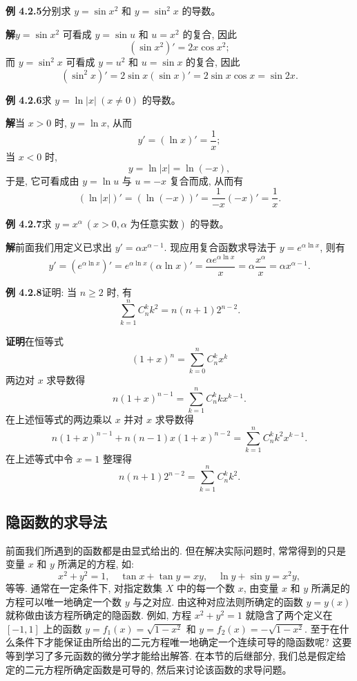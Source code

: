 \documentclass[UTF8,12pt,a4paper,fontset=fandol]{ctexart}
\begin{document}
\noindent\textbf{例 4.2.5}\quad 分别求 $y=\sin x^2$ 和 $y=\sin^2x$ 的导数。

\noindent\textbf{解}\quad $y=\sin x^2$ 可看成 $y=\sin u$ 和 $u=x^2$ 的复合, 因此
\[
  (\sin x^2)'=2x\cos x^2;
\]
而 $y=\sin^2x$ 可看成 $y=u^2$ 和 $u=\sin x$ 的复合, 因此
\[
  (\sin^2x)'=2\sin x(\sin x)'=2\sin x\cos x=\sin2x.
\]

\noindent\textbf{例 4.2.6}\quad 求 $y=\ln|x|\ (x\ne0)$ 的导数。

\noindent\textbf{解}\quad 当 $x>0$ 时, $y=\ln x$, 从而
\[
  y'=(\ln x)'=\frac1x;
\]
当 $x<0$ 时,
\[
  y=\ln|x|=\ln(-x),
\]
于是, 它可看成由 $y=\ln u$ 与 $u=-x$ 复合而成, 从而有
\[
  (\ln|x|)'=(\ln(-x))'=\frac1{-x}(-x)'=\frac1x.
\]

\noindent\textbf{例 4.2.7}\quad 求 $y=x^\alpha\ (x>0,\alpha\text{ 为任意实数})$ 的导数。

\noindent\textbf{解}\quad 前面我们用定义已求出 $y'=\alpha x^{\alpha-1}$. 现应用复合函数求导法于 $y=e^{\alpha\ln x}$, 则有
\[
  y'=(e^{\alpha\ln x})'
  =
  e^{\alpha\ln x}(\alpha\ln x)'
  =
  \frac{\alpha e^{\alpha\ln x}}x
  =
  \alpha\frac{x^\alpha}x
  =
  \alpha x^{\alpha-1}.
\]

\noindent\textbf{例 4.2.8}\quad 证明: 当 $n\geqslant2$ 时, 有
\[
  \sum_{k=1}^{n}C_n^kk^2=n(n+1)2^{n-2}.
\]

\noindent\textbf{证明}\quad 在恒等式
\[
  (1+x)^n=\sum_{k=0}^{n}C_n^kx^k
\]
两边对 $x$ 求导数得
\[
  n(1+x)^{n-1}=\sum_{k=1}^{n}C_n^kkx^{k-1}.
\]
在上述恒等式的两边乘以 $x$ 并对 $x$ 求导数得
\[
  n(1+x)^{n-1}+n(n-1)x(1+x)^{n-2}
  =
  \sum_{k=1}^{n}C_n^kk^2x^{k-1}.
\]
在上述等式中令 $x=1$ 整理得
\[
  n(n+1)2^{n-2}=\sum_{k=1}^{n}C_n^kk^2.
\]

\subsection{隐函数的求导法}

前面我们所遇到的函数都是由显式给出的. 但在解决实际问题时, 常常得到的只是变量 $x$ 和 $y$ 所满足的方程, 如:
\[
  x^2+y^2=1,\quad \tan x+\tan y=xy,\quad \ln y+\sin y=x^2y,
\]
等等. 通常在一定条件下, 对指定数集 $X$ 中的每一个数 $x$, 由变量 $x$ 和 $y$ 所满足的方程可以唯一地确定一个数 $y$ 与之对应. 由这种对应法则所确定的函数 $y=y(x)$ 就称做由该方程所确定的隐函数. 例如, 方程 $x^2+y^2=1$ 就隐含了两个定义在 $[-1,1]$ 上的函数 $y=f_1(x)=\sqrt{1-x^2}$ 和 $y=f_2(x)=-\sqrt{1-x^2}$. 至于在什么条件下才能保证由所给出的二元方程唯一地确定一个连续可导的隐函数呢? 这要等到学习了多元函数的微分学才能给出解答. 在本节的后继部分, 我们总是假定给定的二元方程所确定函数是可导的, 然后来讨论该函数的求导问题。
\end{document}
